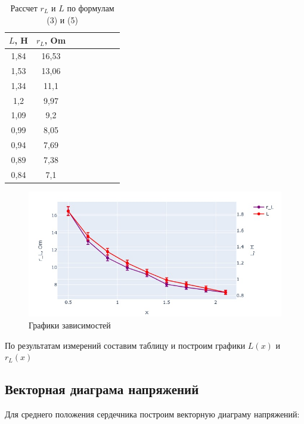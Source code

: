 \documentclass[a4paper, 14pt]{extarticle}%
\begin{document}
\begin{table}[h!]
	\centering
	\caption{Рассчет $ r_{L}$ и $ L $ по формулам (3) и (5) }
	\begin{tabular}{|c|c|c|c|c|c|c|c|}
		\hline
		 $ L $, H & $ r_{L}$, Om \\
		\hline
		  1,84 & 16,53  \\
		 \hline
		  1,53 &  13,06 \\
		 \hline
		 1,34 &  11,1 \\
		 \hline
		 1,2 &  9,97\\
		 \hline
		 1,09 & 9,2 \\
		 \hline
		 0,99 & 8,05\\
		 \hline
		 0,94 &  7,69\\
		 \hline
		 0,89 & 7,38\\
		 \hline
	     0,84 & 7,1 \\
		\hline
	\end{tabular}%
\label{resT}%
\end{table}%

\begin{figure}[h!]
	\includegraphics[width = 1.2\textwidth]{pics/graph322 (1).jpg}
	\caption{Графики зависимостей}
	\label{Pic1}
\end{figure}


По результатам измерений составим таблицу и построим графики $ L(x) $ и $ r_{L}(x) $
\subsection{Векторная диаграма напряжений}

Для среднего положения сердечника построим векторную диаграму напряжений:

\begin{center}

\end{center}\
\end{document}

